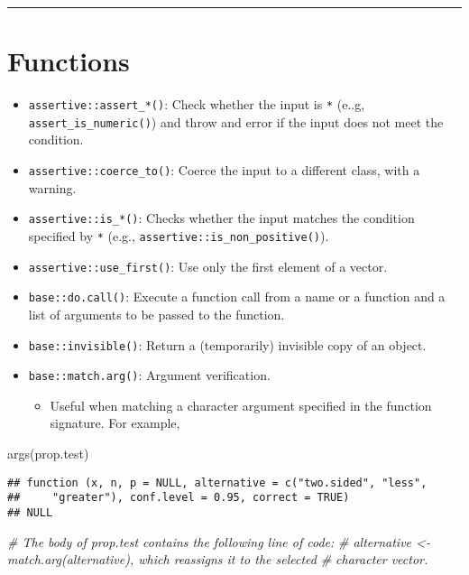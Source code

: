 \documentclass[
]{book}
\newenvironment{Shaded}{\begin{snugshade}}{\end{snugshade}}
\newcommand{\CommentTok}[1]{\textcolor[rgb]{0.56,0.35,0.01}{\textit{#1}}}
\newcommand{\FunctionTok}[1]{\textcolor[rgb]{0.00,0.00,0.00}{#1}}
\newcommand{\NormalTok}[1]{#1}
\providecommand{\tightlist}{%
  \setlength{\itemsep}{0pt}\setlength{\parskip}{0pt}}
\begin{document}
\begin{center}\rule{0.5\linewidth}{0.5pt}\end{center}

\hypertarget{functions}{%
\section{Functions}\label{functions}}

\begin{itemize}
\tightlist
\item
  \texttt{assertive::assert\_*()}: Check whether the input is \texttt{*} (e..g, \texttt{assert\_is\_numeric()}) and throw and error if the input does not meet the condition.
\item
  \texttt{assertive::coerce\_to()}: Coerce the input to a different class, with a warning.
\item
  \texttt{assertive::is\_*()}: Checks whether the input matches the condition specified by \texttt{*} (e.g., \texttt{assertive::is\_non\_positive()}).
\item
  \texttt{assertive::use\_first()}: Use only the first element of a vector.
\item
  \texttt{base::do.call()}: Execute a function call from a name or a function and a list of arguments to be passed to the function.
\item
  \texttt{base::invisible()}: Return a (temporarily) invisible copy of an object.
\item
  \texttt{base::match.arg()}: Argument verification.

  \begin{itemize}
  \tightlist
  \item
    Useful when matching a character argument specified in the function signature. For example,
  \end{itemize}
\end{itemize}

\begin{Shaded}
\begin{Highlighting}[]
\FunctionTok{args}\NormalTok{(prop.test)}
\end{Highlighting}
\end{Shaded}

\begin{verbatim}
## function (x, n, p = NULL, alternative = c("two.sided", "less", 
##     "greater"), conf.level = 0.95, correct = TRUE) 
## NULL
\end{verbatim}

\begin{Shaded}
\begin{Highlighting}[]
\CommentTok{\# The body of \textasciigrave{}prop.test\textasciigrave{} contains the following line of code:}
\CommentTok{\# \textasciigrave{}alternative \textless{}{-} match.arg(alternative), which reassigns it to the selected}
\CommentTok{\# character vector.}
\end{Highlighting}
\end{Shaded}
\end{document}
